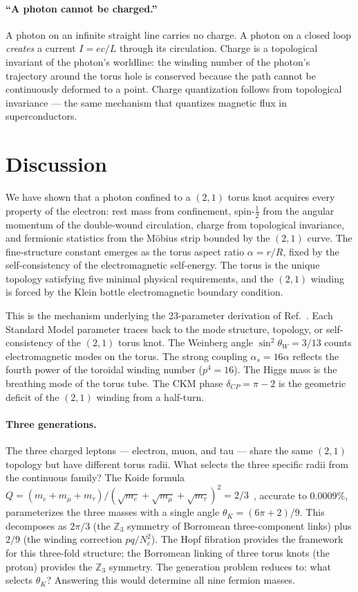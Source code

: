 \documentclass[11pt,a4paper]{article}
\begin{document}
\paragraph{``A photon cannot be charged.''}
A photon on an infinite straight line carries no charge. A photon on a closed loop \emph{creates} a current $I = ec/L$ through its circulation. Charge is a topological invariant of the photon's worldline: the winding number of the photon's trajectory around the torus hole is conserved because the path cannot be continuously deformed to a point. Charge quantization follows from topological invariance --- the same mechanism that quantizes magnetic flux in superconductors.

\section{Discussion}
\label{sec:discussion}

We have shown that a photon confined to a $(2,1)$ torus knot acquires every property of the electron: rest mass from confinement, spin-$\tfrac{1}{2}$ from the angular momentum of the double-wound circulation, charge from topological invariance, and fermionic statistics from the M\"obius strip bounded by the $(2,1)$ curve. The fine-structure constant emerges as the torus aspect ratio $\alpha = r/R$, fixed by the self-consistency of the electromagnetic self-energy. The torus is the unique topology satisfying five minimal physical requirements, and the $(2,1)$ winding is forced by the Klein bottle electromagnetic boundary condition.

This is the mechanism underlying the 23-parameter derivation of Ref.~\cite{paper1}. Each Standard Model parameter traces back to the mode structure, topology, or self-consistency of the $(2,1)$ torus knot. The Weinberg angle $\sin^2\theta_W = 3/13$ counts electromagnetic modes on the torus. The strong coupling $\alpha_s = 16\alpha$ reflects the fourth power of the toroidal winding number ($p^4 = 16$). The Higgs mass is the breathing mode of the torus tube. The CKM phase $\delta_{CP} = \pi - 2$ is the geometric deficit of the $(2,1)$ winding from a half-turn.

\paragraph{Three generations.}
The three charged leptons --- electron, muon, and tau --- share the same $(2,1)$ topology but have different torus radii. What selects the three specific radii from the continuous family? The Koide formula $Q = (m_e + m_\mu + m_\tau)/(\sqrt{m_e} + \sqrt{m_\mu} + \sqrt{m_\tau})^2 = 2/3$~\cite{koide1983}, accurate to 0.0009\%, parameterizes the three masses with a single angle $\theta_K = (6\pi + 2)/9$. This decomposes as $2\pi/3$ (the $\mathbb{Z}_3$ symmetry of Borromean three-component links) plus $2/9$ (the winding correction $pq/N_c^2$). The Hopf fibration provides the framework for this three-fold structure; the Borromean linking of three torus knots (the proton) provides the $\mathbb{Z}_3$ symmetry. The generation problem reduces to: what selects $\theta_K$? Answering this would determine all nine fermion masses.
\end{document}
